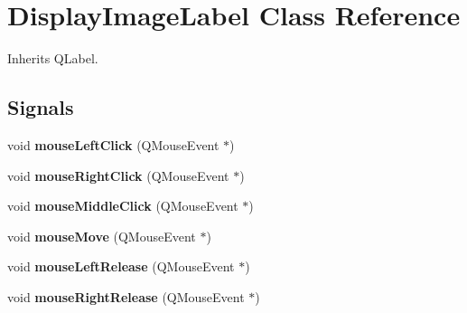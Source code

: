 \hypertarget{class_display_image_label}{}\section{Display\+Image\+Label Class Reference}
\label{class_display_image_label}


Inherits Q\+Label.

\subsection*{Signals}
\begin{DoxyCompactItemize}
\item 
\mbox{\label{class_display_image_label_aadb2e9a9174ee62aa32d9e8bd5d760e0}} 
void {\bfseries mouse\+Left\+Click} (Q\+Mouse\+Event $\ast$)
\item 
\mbox{\label{class_display_image_label_a0309540728cc92d7e9af722447a68224}} 
void {\bfseries mouse\+Right\+Click} (Q\+Mouse\+Event $\ast$)
\item 
\mbox{\label{class_display_image_label_a35f3738459f621bfaebb762a93d73e2a}} 
void {\bfseries mouse\+Middle\+Click} (Q\+Mouse\+Event $\ast$)
\item 
\mbox{\label{class_display_image_label_aaa22c9caed03c60d7f81d199cc2dbee8}} 
void {\bfseries mouse\+Move} (Q\+Mouse\+Event $\ast$)
\item 
\mbox{\label{class_display_image_label_ab7226c1db2b97c75ebd0fc7cd2afdc17}} 
void {\bfseries mouse\+Left\+Release} (Q\+Mouse\+Event $\ast$)
\item 
\mbox{\label{class_display_image_label_a6a21de36d39062341c6ed3d70c7e4c10}} 
void {\bfseries mouse\+Right\+Release} (Q\+Mouse\+Event $\ast$)
\end{DoxyCompactItemize}
